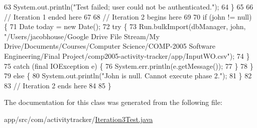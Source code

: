 \begin{DoxyCode}
63             System.out.println(\textcolor{stringliteral}{"Test failed; user could not be authenticated."});
64         \}
65 
66         \textcolor{comment}{// Iteration 1 ended here}
67 
68         \textcolor{comment}{// Iteration 2 begins here}
69 
70         \textcolor{keywordflow}{if} (john !=  null) \{
71             Date today = \textcolor{keyword}{new} Date();
72             \textcolor{keywordflow}{try} \{
73                 Run.bulkImport(dbManager, john, \textcolor{stringliteral}{"/Users/jacobhouse/Google Drive File Stream/My
       Drive/Documents/Courses/Computer Science/COMP-2005 Software Engineering/Final
       Project/comp2005-activity-tracker/app/InputWO.csv"});
74             \}
75             \textcolor{keywordflow}{catch} (\textcolor{keyword}{final} IOException e) \{
76                 System.err.println(e.getMessage());
77             \}
78         \}
79         \textcolor{keywordflow}{else} \{
80             System.out.println(\textcolor{stringliteral}{"John is null. Cannot execute phase 2."});
81         \}
82 
83         \textcolor{comment}{// Iteration 2 ends here}
84 
85     \}
\end{DoxyCode}


The documentation for this class was generated from the following file\+:\begin{DoxyCompactItemize}
\item 
app/src/com/activitytracker/\hyperlink{_iteration3_test_8java}{Iteration3\+Test.\+java}\end{DoxyCompactItemize}
